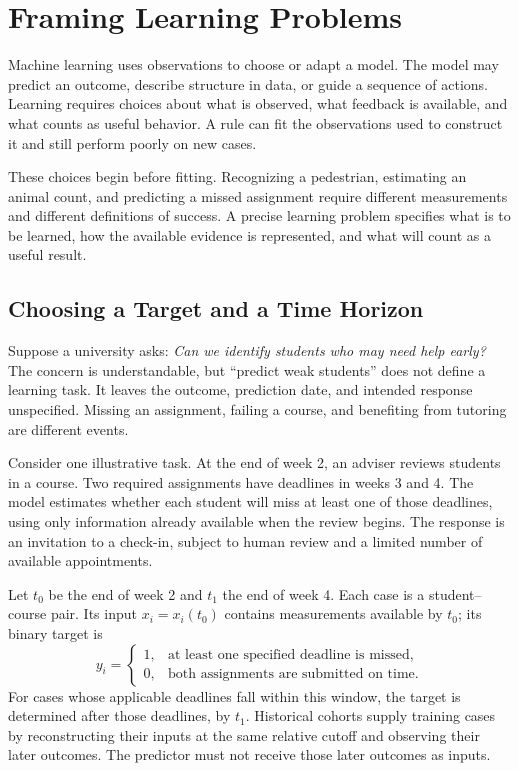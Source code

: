 \begingroup
\raggedbottom
\chapter{Framing Learning Problems}
\label{ch:framing-learning-problems}

Machine learning uses observations to choose or adapt a model. The model may predict an outcome, describe structure in data, or guide a sequence of actions. Learning requires choices about what is observed, what feedback is available, and what counts as useful behavior. A rule can fit the observations used to construct it and still perform poorly on new cases.

These choices begin before fitting. Recognizing a pedestrian, estimating an animal count, and predicting a missed assignment require different measurements and different definitions of success. A precise learning problem specifies what is to be learned, how the available evidence is represented, and what will count as a useful result.

\section{Choosing a Target and a Time Horizon}

Suppose a university asks: \emph{Can we identify students who may need help early?} The concern is understandable, but ``predict weak students'' does not define a learning task. It leaves the outcome, prediction date, and intended response unspecified. Missing an assignment, failing a course, and benefiting from tutoring are different events.

Consider one illustrative task. At the end of week 2, an adviser reviews students in a course. Two required assignments have deadlines in weeks 3 and 4. The model estimates whether each student will miss at least one of those deadlines, using only information already available when the review begins. The response is an invitation to a check-in, subject to human review and a limited number of available appointments.

Let $t_0$ be the end of week 2 and $t_1$ the end of week 4. Each case is a student--course pair. Its input $x_i=x_i(t_0)$ contains measurements available by $t_0$; its binary target is
\[
y_i=
\begin{cases}
1, & \text{at least one specified deadline is missed},\\
0, & \text{both assignments are submitted on time}.
\end{cases}
\]
For cases whose applicable deadlines fall within this window, the target is determined after those deadlines, by $t_1$. Historical cohorts supply training cases by reconstructing their inputs at the same relative cutoff and observing their later outcomes. The predictor must not receive those later outcomes as inputs.

